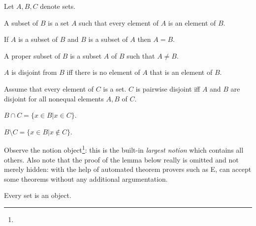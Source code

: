 \begin{forthel}
    Let $A,B,C$ denote sets.

    \begin{definition}
        A subset of $B$ is a set $A$ such that
        every element of $A$ is an element of $B$.
    \end{definition}

    \begin{axiom}[Extensionality]
        If $A$ is a subset of $B$ and
        $B$ is a subset of $A$ then $A = B$.
    \end{axiom}

    \begin{definition}
        A proper subset of $B$ is a subset $A$ of $B$ such that $A\neq B$.
    \end{definition}

    \begin{definition}
        $A$ is disjoint from $B$ iff there is no element of $A$ that is an element of $B$.
    \end{definition}

    \begin{definition}
        Assume that every element of $C$ is a set.
        $C$ is pairwise disjoint iff $A$ and $B$ are disjoint for all nonequal
        elements $A, B$ of $C$.
    \end{definition}


    \begin{definition}
        $B \cap C = \{ x \in B | x \in C\}$.
    \end{definition}

    \begin{definition}
        $B \setminus C = \{ x \in B | x \notin C\}$.
    \end{definition}
\end{forthel}

Observe the notion \textsf{object}\footnote{}:
this is the built-in \textit{largest notion} which contains all others.
%
Also note that the proof of the lemma below really is omitted and not merely hidden:
with the help of automated theorem provers such as \textsf{E}, \Naproche{}
can accept some theorems without any additional argumentation.


\begin{forthel}
    \begin{lemma}
        Every set is an object.
    \end{lemma}
\end{forthel}

